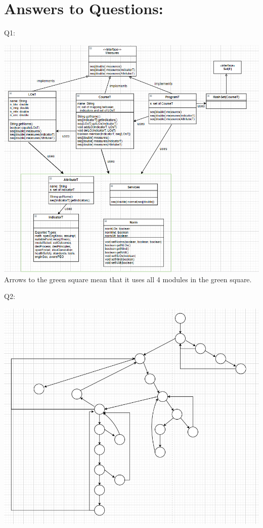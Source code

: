 \documentclass[12pt]{article}
\begin{document}
\newpage

\section*{Answers to Questions:}

Q1:
\begin{center}
  \includegraphics[width=1.2\textwidth]{A3_UML.png}
  Arrows to the green square mean that it uses all 4 modules in the green square.
\end{center}

Q2:
\begin{center}
  \includegraphics[width=1.0\textwidth]{control_flow2.png}
\end{center}
\end{document}
